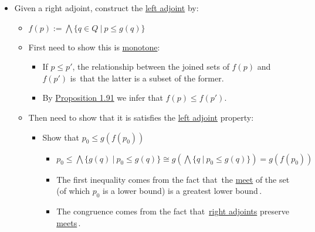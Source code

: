 \begin{itemize}
    \item Given a right adjoint, construct the \href{doc/1 math/Seven Sketches in Compositionality/Chapter 1: Generative Effects/6 Galois connections/1 Definition and examples/Galois connection}{left adjoint} by:
          \begin{itemize}
            \item $f(p) := \bigwedge\{q \in Q\ |\ p \leq g(q)\}$
            \item First need to show this is \href{doc/1 math/Seven Sketches in Compositionality/Chapter 1: Generative Effects/4 Monotone maps/1 Monotone map}{monotone}:
                  \begin{itemize}
                    \item If $p \leq p'$, the relationship between the joined sets of $f(p)$ and $f(p')$ is \,that the latter is a subset of the former.\,
                    \item By \href{doc/1 math/Seven Sketches in Compositionality/Chapter 1: Generative Effects/5 Meets and joins/1 Definition and basic examples/Meets of subsets}{Proposition 1.91} we infer that $f(p) \leq f(p')$.
                  \end{itemize}
            \item Then need to show that it is satisfies the \href{doc/1 math/Seven Sketches in Compositionality/Chapter 1: Generative Effects/6 Galois connections/1 Definition and examples/Galois connection}{left adjoint} property:
                  \begin{itemize}
                    \item Show that $p_0 \leq g(f(p_0))$
                          \begin{itemize}
                            \item  $p_0 \leq \bigwedge \{g(q)\ |\ p_0 \leq g(q)\} \cong g(\bigwedge\{q\ |\ p_0 \leq g(q)\}) = g(f(p_0))$
                            \item The first inequality comes from the fact that \,the \href{doc/1 math/Seven Sketches in Compositionality/Chapter 1: Generative Effects/5 Meets and joins/1 Definition and basic examples/Meet and join}{meet} of the set (of which $p_0$ is a lower bound) is a greatest lower bound\,.
                            \item The congruence comes from the fact that \,\href{doc/1 math/Seven Sketches in Compositionality/Chapter 1: Generative Effects/6 Galois connections/1 Definition and examples/Galois connection}{right adjoints} preserve \href{doc/1 math/Seven Sketches in Compositionality/Chapter 1: Generative Effects/5 Meets and joins/1 Definition and basic examples/Meet and join}{meets}\,.

\end{itemize}
\end{itemize}
\end{itemize}
\end{itemize}
